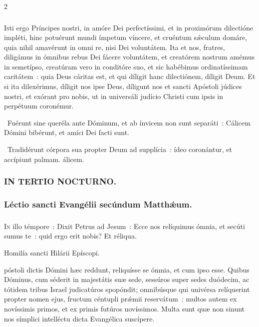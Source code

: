 \documentclass[9pt,twoside]{extarticle}
\begin{document}
\begin{multicols}{2}
{{{\subsubsection*{\center {}}
\lettrine{I}sti ergo Príncipes nostri, in amóre Dei perfectíssimi, et in proximórum dilectióne impléti, hinc potuérunt mundi ímpetum víncere, et cruéntum sǽculum domáre, quia nihil amavérunt in omni re, nisi Dei voluntátem. Ita et nos, fratres, diligámus in ómnibus rebus Dei fácere voluntátem, et creatórem nostrum amémus in semetípso, creatúram vero in conditóre suo, et sic habébimus ordinatíssimam caritátem~: quia Deus cáritas est, et qui díligit hanc dilectiónem, díligit Deum. Et si ita dilexérimus, díligit nos ipse Deus, díligunt nos et sancti Apóstoli júdices nostri, et exórant pro nobis, ut in universáli judício Christi cum ipsis in perpétuum coronémur.

\begin{tightlist}{}
\item {}~Fuérunt sine queréla ante Dóminum, et ab ínvicem non sunt separáti~: \textred{*} Cálicem Dómini bibérunt, et amíci Dei facti sunt.
\item {}~Tradidérunt córpora sua propter Deum ad supplícia~: ídeo coronántur, et accípiunt palmam. álicem.
\end{tightlist}

\subsubsection*{\center \textsc{IN TERTIO NOCTURNO.}}
\subsubsection*{\center Léctio sancti Evangélii secúndum Matthǽum.}
\subsubsection*{\center {}}
\lettrine{I}n illo témpore~: Dixit Petrus ad Jesum~: Ecce nos relíquimus ómnia, et secúti sumus te~: quid ergo erit nobis? Et réliqua.

\begin{center}Homilía sancti Hilárii Epíscopi.\\
\end{center}
póstoli dictis Dómini hæc reddunt, reliquísse se ómnia, et cum ipso esse. Quibus Dóminus, cum séderit in majestátis suæ sede, sessúros super sedes duódecim, ac tótidem tribus Israel judicatúros spopóndit; omnibúsque qui univérsa relíquerint propter nomen ejus, fructum céntupli prǽmii reservátum~: multos autem ex novíssimis primos, et ex primis futúros novíssimos. Multa sunt quæ non sinunt nos símplici intelléctu dicta Evangélica suscípere.

}}}
\end{multicols}
\end{document}
